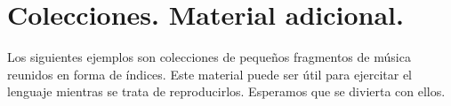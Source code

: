 \section{Colecciones. Material adicional.}

Los siguientes ejemplos son colecciones de pequeños fragmentos de
música reunidos en forma de índices.  Este material puede ser útil
para ejercitar el lenguaje mientras se trata de
reproducirlos. Esperamos que se divierta con ellos.






